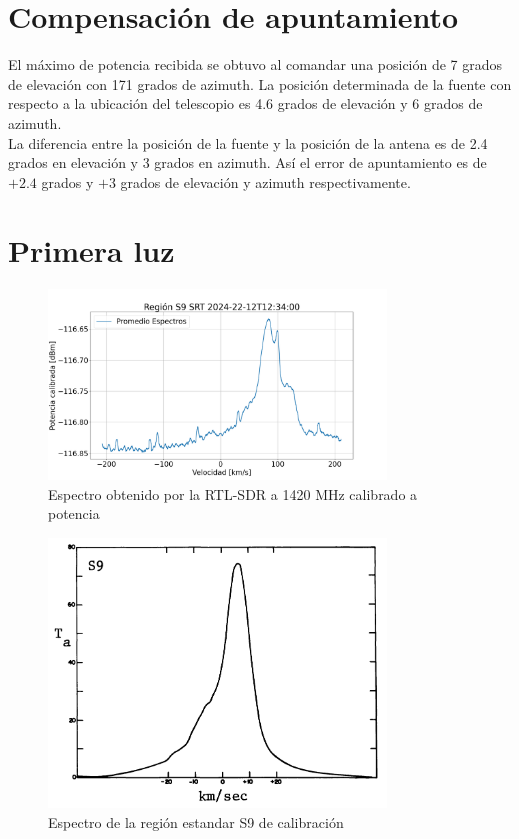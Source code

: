 \section{Compensación de apuntamiento}

El máximo de potencia recibida se obtuvo al comandar una posición de 7 grados de elevación con 171 grados de azimuth. La posición determinada de la fuente con respecto a la ubicación del telescopio es 4.6 grados de elevación y 6 grados de azimuth.\\

La diferencia entre la posición de la fuente y la posición de la antena es de 2.4 grados en elevación y 3 grados en azimuth. Así el error de apuntamiento es de $+2.4$ grados y $+3$ grados de elevación y azimuth respectivamente.\\


\section{Primera luz}

\begin{figure}
    \centering
    \includegraphics[width=0.8\textwidth]{img/h1speed}
    \caption{Espectro obtenido por la RTL-SDR a 1420 MHz calibrado a potencia}
    \label{fig:firstlight}
\end{figure}

\begin{figure}
    \centering
    \includegraphics[width=0.8\textwidth]{img/williams}
    \caption{Espectro de la región estandar S9 de calibración \cite{williams73}}
    \label{fig:williams}
\end{figure}

